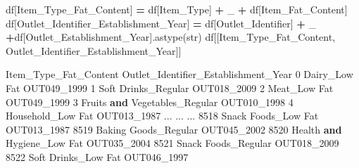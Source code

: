 \documentclass[
]{book}
\newenvironment{Shaded}{\begin{snugshade}}{\end{snugshade}}
\newcommand{\DecValTok}[1]{\textcolor[rgb]{0.00,0.00,0.81}{#1}}
\newcommand{\KeywordTok}[1]{\textcolor[rgb]{0.13,0.29,0.53}{\textbf{#1}}}
\newcommand{\NormalTok}[1]{#1}
\newcommand{\OperatorTok}[1]{\textcolor[rgb]{0.81,0.36,0.00}{\textbf{#1}}}
\newcommand{\StringTok}[1]{\textcolor[rgb]{0.31,0.60,0.02}{#1}}
\begin{document}
\begin{Shaded}
\begin{Highlighting}[]
\NormalTok{df[}\StringTok{\textquotesingle{}Item\_Type\_Fat\_Content\textquotesingle{}}\NormalTok{] }\OperatorTok{=}\NormalTok{ df[}\StringTok{\textquotesingle{}Item\_Type\textquotesingle{}}\NormalTok{] }\OperatorTok{+} \StringTok{\textquotesingle{}\_\textquotesingle{}} \OperatorTok{+}\NormalTok{ df[}\StringTok{\textquotesingle{}Item\_Fat\_Content\textquotesingle{}}\NormalTok{]}
\NormalTok{df[}\StringTok{\textquotesingle{}Outlet\_Identifier\_Establishment\_Year\textquotesingle{}}\NormalTok{] }\OperatorTok{=}\NormalTok{ df[}\StringTok{\textquotesingle{}Outlet\_Identifier\textquotesingle{}}\NormalTok{] }\OperatorTok{+} \StringTok{\textquotesingle{}\_\textquotesingle{}} \OperatorTok{+}\NormalTok{df[}\StringTok{\textquotesingle{}Outlet\_Establishment\_Year\textquotesingle{}}\NormalTok{].astype(}\StringTok{\textquotesingle{}str\textquotesingle{}}\NormalTok{)}
\NormalTok{df[[}\StringTok{\textquotesingle{}Item\_Type\_Fat\_Content\textquotesingle{}}\NormalTok{, }\StringTok{\textquotesingle{}Outlet\_Identifier\_Establishment\_Year\textquotesingle{}}\NormalTok{]]}
\end{Highlighting}
\end{Shaded}

\begin{Shaded}
\begin{Highlighting}[]
\NormalTok{              Item\_Type\_Fat\_Content Outlet\_Identifier\_Establishment\_Year}
\DecValTok{0}\NormalTok{                     Dairy\_Low Fat                          OUT049\_1999}
\DecValTok{1}\NormalTok{               Soft Drinks\_Regular                          OUT018\_2009}
\DecValTok{2}\NormalTok{                      Meat\_Low Fat                          OUT049\_1999}
\DecValTok{3}\NormalTok{     Fruits }\KeywordTok{and}\NormalTok{ Vegetables\_Regular                          OUT010\_1998}
\DecValTok{4}\NormalTok{                 Household\_Low Fat                          OUT013\_1987}
\NormalTok{...                             ...                                  ...}
\DecValTok{8518}\NormalTok{            Snack Foods\_Low Fat                          OUT013\_1987}
\DecValTok{8519}\NormalTok{           Baking Goods\_Regular                          OUT045\_2002}
\DecValTok{8520}\NormalTok{     Health }\KeywordTok{and}\NormalTok{ Hygiene\_Low Fat                          OUT035\_2004}
\DecValTok{8521}\NormalTok{            Snack Foods\_Regular                          OUT018\_2009}
\DecValTok{8522}\NormalTok{            Soft Drinks\_Low Fat                          OUT046\_1997}
\end{Highlighting}
\end{Shaded}
\end{document}
